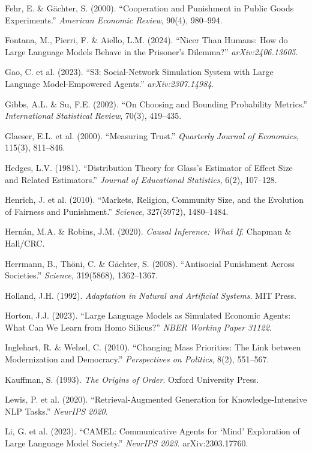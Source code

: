 {Fehr, E. \& Gächter, S. (2000). ``Cooperation and Punishment in Public Goods Experiments.'' \textit{American Economic Review}, 90(4), 980--994.\par\smallskip
Fontana, M., Pierri, F. \& Aiello, L.M. (2024). ``Nicer Than Humans: How do Large Language Models Behave in the Prisoner's Dilemma?'' \textit{arXiv:2406.13605}.\par\smallskip
Gao, C. et al. (2023). ``S3: Social-Network Simulation System with Large Language Model-Empowered Agents.'' \textit{arXiv:2307.14984}.\par\smallskip
Gibbs, A.L. \& Su, F.E. (2002). ``On Choosing and Bounding Probability Metrics.'' \textit{International Statistical Review}, 70(3), 419--435.\par\smallskip
Glaeser, E.L. et al. (2000). ``Measuring Trust.'' \textit{Quarterly Journal of Economics}, 115(3), 811--846.\par\smallskip
Hedges, L.V. (1981). ``Distribution Theory for Glass's Estimator of Effect Size and Related Estimators.'' \textit{Journal of Educational Statistics}, 6(2), 107--128.\par\smallskip
Henrich, J. et al. (2010). ``Markets, Religion, Community Size, and the Evolution of Fairness and Punishment.'' \textit{Science}, 327(5972), 1480--1484.\par\smallskip
Hernán, M.A. \& Robins, J.M. (2020). \textit{Causal Inference: What If}. Chapman \& Hall/CRC.\par\smallskip
Herrmann, B., Thöni, C. \& Gächter, S. (2008). ``Antisocial Punishment Across Societies.'' \textit{Science}, 319(5868), 1362--1367.\par\smallskip
Holland, J.H. (1992). \textit{Adaptation in Natural and Artificial Systems}. MIT Press.\par\smallskip
Horton, J.J. (2023). ``Large Language Models as Simulated Economic Agents: What Can We Learn from Homo Silicus?'' \textit{NBER Working Paper 31122}.\par\smallskip
Inglehart, R. \& Welzel, C. (2010). ``Changing Mass Priorities: The Link between Modernization and Democracy.'' \textit{Perspectives on Politics}, 8(2), 551--567.\par\smallskip
Kauffman, S. (1993). \textit{The Origins of Order}. Oxford University Press.\par\smallskip
Lewis, P. et al. (2020). ``Retrieval-Augmented Generation for Knowledge-Intensive NLP Tasks.'' \textit{NeurIPS 2020}.\par\smallskip
Li, G. et al. (2023). ``CAMEL: Communicative Agents for `Mind' Exploration of Large Language Model Society.'' \textit{NeurIPS 2023}. arXiv:2303.17760.\par\smallskip
}
